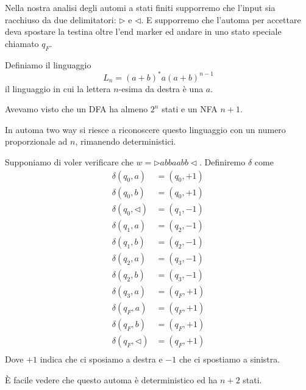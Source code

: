\documentclass[12pt]{article}
\begin{document}
Nella nostra analisi degli automi a stati finiti supporremo che l'input sia racchiuso da due delimitatori: $\rhd$ e $\lhd$.
E supporremo che l'automa per accettare deva spostare la testina oltre l'end marker ed andare in uno stato speciale chiamato $q_F$.
\begin{tcolorbox}
	Definiamo il linguaggio
	$$ L_n = (a + b)^* a (a + b)^{n - 1} $$
	il linguaggio in cui la lettera $n$-esima da destra è una $a$.

	Avevamo visto che un DFA ha almeno $2^n$ stati e un NFA $n + 1$.

	In automa two way si riesce a riconoscere questo linguaggio con un numero proporzionale ad $n$, rimanendo deterministici.

	Supponiamo di voler verificare che $w = \rhd abbaabb \lhd$.
	Definiremo $\delta$ come
	\begin{align*}
		\delta(q_0, a) &= (q_0, + 1) \\
		\delta(q_0, b) &= (q_0, + 1) \\
		\delta(q_0, \lhd) &= (q_1, - 1) \\
		\delta(q_1, a) &= (q_2, - 1) \\
		\delta(q_1, b) &= (q_2, - 1) \\
		\delta(q_2, a) &= (q_3, - 1) \\
		\delta(q_2, b) &= (q_3, - 1) \\
		\delta(q_3, a) &= (q_F, + 1) \\
		\delta(q_F, a) &= (q_F, + 1) \\
		\delta(q_F, b) &= (q_F, + 1) \\
		\delta(q_F, \lhd) &= (q_F, + 1) \\
	\end{align*}
	Dove $+1$ indica che ci sposiamo a destra e $-1$ che ci spostiamo a sinistra.

	\`E facile vedere che questo automa è deterministico ed ha $n + 2$ stati.
\end{tcolorbox}
\end{document}

